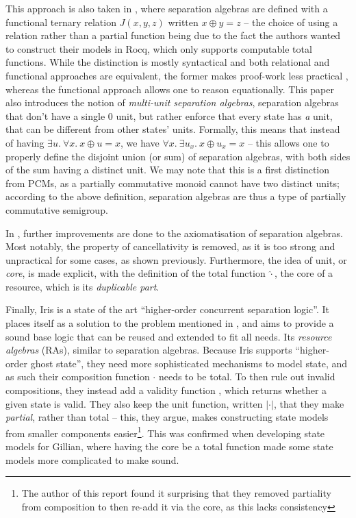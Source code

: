 This approach is also taken in \cite{sepalgebra}, where separation algebras are defined with a functional ternary relation $J(x,y,z)$ written $x\oplus y=z$ -- the choice of using a relation rather than a partial function being due to the fact the authors wanted to construct their models in Rocq, which only supports computable total functions. While the distinction is mostly syntactical and both relational and functional approaches are equivalent, the former makes proof-work less practical \cite{statesoundness, iris}, whereas the functional approach allows one to reason equationally. This paper also introduces the notion of \emph{multi-unit separation algebras}, separation algebras that don't have a single $0$ unit, but rather enforce that every state has \emph{a} unit, that can be different from other states' units. Formally, this means that instead of having $\exists u.~\forall x.~x \oplus u = x$, we have $\forall x.~\exists u_x.~ x\oplus u_x=x$ -- this allows one to properly define the disjoint union (or sum) of separation algebras, with both sides of the sum having a distinct unit. We may note that this is a first distinction from PCMs, as a partially commutative monoid cannot have two distinct units; according to the above definition, separation algebras are thus a type of partially commutative semigroup.

In \cite{statesoundness}, further improvements are done to the axiomatisation of separation algebras. Most notably, the property of cancellativity is removed, as it is too strong and unpractical for some cases, as shown previously. Furthermore, the idea of unit, or \emph{core}, is made explicit, with the definition of the total function $\hat\cdot$, the core of a resource, which is its \emph{duplicable part}.

Finally, Iris \cite{iris} is a state of the art ``higher-order concurrent separation logic''. It places itself as a solution to the problem mentioned in \cite{next700seplogics}, and aims to provide a sound base logic that can be reused and extended to fit all needs. Its \emph{resource algebras} (RAs), similar to separation algebras. Because Iris supports ``higher-order ghost state'', they need more sophisticated mechanisms to model state, and as such their composition function $\cdot$ needs to be total. To then rule out invalid compositions, they instead add a validity function \irisval, which returns whether a given state is valid. They also keep the unit function, written $|\cdot|$, that they make \emph{partial}, rather than total -- this, they argue, makes constructing state models from smaller components easier\footnote{The author of this report found it surprising that they removed partiality from composition to then re-add it via the core, as this lacks consistency}. This was confirmed when developing state models for Gillian, where having the core be a total function made some state models more complicated to make sound.

